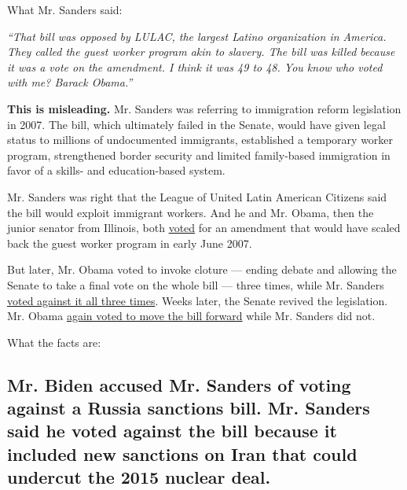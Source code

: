 What Mr. Sanders said:

\emph{``That bill was opposed by LULAC, the largest Latino organization
in America. They called the guest worker program akin to slavery. The
bill was killed because it was a vote on the amendment. I think it was
49 to 48. You know who voted with me? Barack Obama.''}

\textbf{This is misleading.} Mr. Sanders was referring to immigration
reform legislation in 2007. The bill, which ultimately failed in the
Senate, would have given legal status to millions of undocumented
immigrants, established a temporary worker program, strengthened border
security and limited family-based immigration in favor of a skills- and
education-based system.

Mr. Sanders was right that the League of United Latin American Citizens
said the bill would exploit immigrant workers. And he and Mr. Obama,
then the junior senator from Illinois, both
\href{https://www.senate.gov/legislative/LIS/roll_call_lists/roll_call_vote_cfm.cfm?congress=110\&session=1\&vote=00201}{voted}
for an amendment that would have scaled back the guest worker program in
early June 2007.

But later, Mr. Obama voted to invoke cloture --- ending debate and
allowing the Senate to take a final vote on the whole bill --- three
times, while Mr. Sanders
\href{https://www.congress.gov/bill/110th-congress/senate-bill/1348/all-actions?overview=closed\&q=\%7B\%22roll-call-vote\%22:\%22all\%22\%7D\&KWICView=false}{voted
against it all three times}. Weeks later, the Senate revived the
legislation. Mr. Obama
\href{https://www.congress.gov/bill/110th-congress/senate-bill/1639/all-actions?overview=closed\&q=\%7B\%22roll-call-vote\%22:\%22all\%22\%7D\&KWICView=false}{again
voted to move the bill forward} while Mr. Sanders did not.

What the facts are:

\hypertarget{mr-biden-accused-mr-sanders-of-voting-against-a-russia-sanctions-bill-mr-sanders-said-he-voted-against-the-bill-because-it-included-new-sanctions-on-iran-that-could-undercut-the-2015-nuclear-deal}{%
\subsection{Mr. Biden accused Mr. Sanders of voting against a Russia
sanctions bill. Mr. Sanders said he voted against the bill because it
included new sanctions on Iran that could undercut the 2015 nuclear
deal.}\label{mr-biden-accused-mr-sanders-of-voting-against-a-russia-sanctions-bill-mr-sanders-said-he-voted-against-the-bill-because-it-included-new-sanctions-on-iran-that-could-undercut-the-2015-nuclear-deal}}

